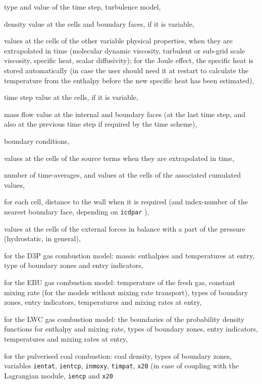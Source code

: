 {{{\begin{list}{-}{}
\item type and value of the time step, turbulence model,
\item density value at the cells and boundary faces, if it is variable,
\item values at the cells of the other variable physical properties,
when they are extrapolated in time (molecular dynamic viscosity, turbulent or
sub-grid scale viscosity, specific heat, scalar diffusivity); for the Joule
effect, the specific heat is stored automatically (in case the user should need
it at restart to calculate the temperature from the enthalpy before the new
specific heat has been estimated),
\item time step value at the cells, if it is variable,
\item mass flow value at the internal and boundary faces (at the last
time step, and also at the previous time step if required by the time scheme),
\item boundary conditions,
\item values at the cells of the source terms when they are extrapolated in time,
\item number of time-averages, and values at the cells of the associated
cumulated values,
\item for each cell, distance to the wall when it is required (and
index-number of the nearest boundary face, depending on \texttt{icdpar}%
),
\item values at the cells of the external forces in balance with a part
of the pressure (hydrostatic, in general),
\item for the D3P gas combustion model: massic enthalpies and temperatures at entry,
type of boundary zones and entry indicators,
\item for the EBU gas combustion model: temperature of the fresh gas, constant
mixing rate (for the models without mixing rate transport), types of boundary
zones, entry indicators, temperatures and mixing rates at entry,
\item for the LWC gas combustion model: the boundaries of the probability
density functions for enthalpy and mixing rate, types of boundary
zones, entry indicators, temperatures and mixing rates at entry,
\item for the pulverised coal combustion: coal density,  types of boundary
zones, variables \texttt{ientat}, \texttt{ientcp}, \texttt{inmoxy}, \texttt{timpat}, \texttt{x20}
(in case of coupling with the Lagrangian module, \texttt{iencp} and \texttt{x20}

\end{list}}}}
